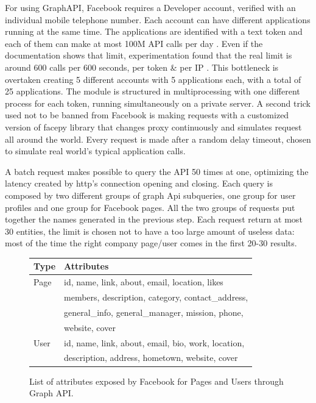 For using GraphAPI, Facebook requires a Developer account, verified with an individual mobile telephone number. Each account can have different applications running at the same time. The applications are identified with a text token and each of them can make at most 100M API calls per day
. Even if the documentation shows that limit, experimentation found that the real limit is around 600 calls per 600 seconds, per token \& per IP
. This bottleneck is overtaken creating 5 different accounts with 5 applications each, with a total of 25 applications.
The module is structured in multiprocessing with one different process for each token, running simultaneously on a private server. A second trick used not to be banned from Facebook is making requests with a customized version of facepy
 library that changes proxy continuously and simulates request all around the world. Every request is made after a random delay timeout, chosen to simulate real world's typical application calls.


A batch request makes possible to query the API 50 times at one, optimizing the latency created by http's connection opening and closing.  Each query is composed by two different groups of graph Api subqueries, one group for user profiles and one group for Facebook pages. All the two groups of requests put together the names generated in the previous step. Each request return at most 30 entities, the limit is chosen not to have a too large amount of useless data: most of the time the right company page/user comes in the first 20-30 results.

\begin{figure}
\begin{tabular}{| l | l |}
    \hline
    Type & Attributes \\ \hline
    Page & id, name, link, about, email, location, likes\\
         & members, description, category, contact\_address,\\
         & general\_info, general\_manager, mission, phone,\\
         & website, cover\\
    \hline
    User & id, name, link, about, email, bio, work, location,\\
         & description, address, hometown, website, cover\\
    \hline
\end{tabular}
    \caption{List of attributes exposed by Facebook for Pages and Users through Graph API.}
    \label{Fig.3}
\end{figure}


